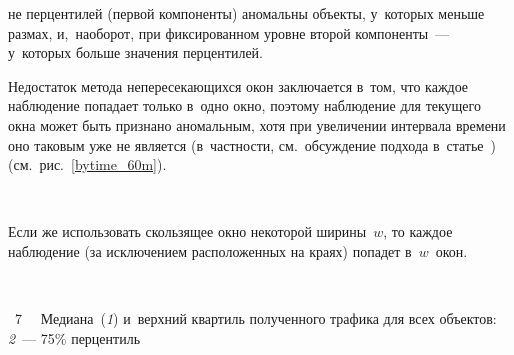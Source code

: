\begin{multicols}{2}

\noindent
не 
пер\-цен\-ти\-лей (пер\-вой компоненты) аномальны
объекты, у~которых меньше размах, и,~наоборот, 
при фиксированном уровне второй компоненты~--- у~которых больше 
значения пер\-цен\-ти\-лей.


Недостаток метода не\-пе\-ре\-се\-ка\-ющих\-ся окон заключается в~том, что каж\-дое наблюдение 
попадает только в~одно окно, поэтому наблюдение для текущего окна может быть 
при\-зна\-но аномальным, хотя при увеличении интервала времени оно таковым уже не 
является (в~част\-ности, см.\ об\-суж\-де\-ние под\-хо\-да в~статье~\cite{Gorshenin2020}) 
(см.\ рис.~\ref{bytime_60m}).


\addtocounter{figure}{1}

\begin{figure*}[b] %
\vspace*{-3pt}
\begin{center}
   \mbox{%
\epsfxsize=148.67mm 
}
\end{center}
\vspace*{-12pt}
    \label{disjoint_window_60m}
\end{figure*}


Если же использовать скользящее окно некоторой ширины~$w$, то каж\-дое наблюдение 
(за исключением расположенных на краях) попадет в~$w$~окон.\linebreak
\vspace*{-12pt} 

{ \begin{center}  %
 \vspace*{-6pt}
    \mbox{%
 \epsfxsize=79mm 
 }

\end{center}
 \vspace*{-3pt}

\noindent
{{\figurename~7}\ \ \small{ Медиана~(\textit{1}) и~верхний квар\-тиль полученного 
трафика для всех объектов: \textit{2}~--- 75\% пер\-цен\-тиль}
\label{netin_percentiles}

}}

\vspace*{6pt}





\end{multicols}
